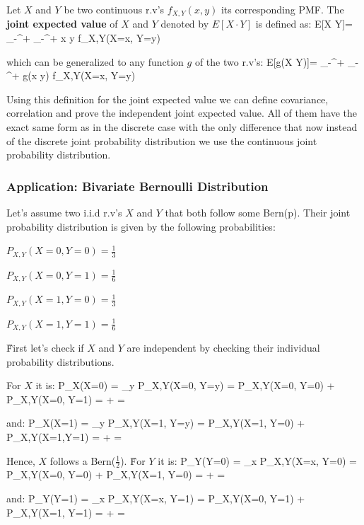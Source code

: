 Let $X$ and $Y$ be two continuous r.v's $f_{X,Y}(x,y)$ its corresponding PMF. The \textbf{joint expected value} of
$X$ and $Y$ denoted by $E[X \cdot Y]$ is defined as:
\bse
E[X \cdot Y]= \int_{-\infty}^{+\infty} \int_{-\infty}^{+\infty} x \cdot y \cdot f_{X,Y}(X=x, Y=y)
\ese
\ed

which can be generalized to any function $g$ of the two r.v's:
\bse
E[g(X \cdot Y)]= \int_{-\infty}^{+\infty} \int_{-\infty}^{+\infty} g(x \cdot y) \cdot f_{X,Y}(X=x, Y=y)
\ese

Using this definition for the joint expected value we can define covariance, correlation and prove the independent
joint expected value. All of them have the exact same form as in the discrete case with the only difference that now
instead of the discrete joint probability distribution we use the continuous joint probability distribution.

\subsubsection*{Application: Bivariate Bernoulli Distribution}

Let's assume two i.i.d r.v's $X$ and $Y$ that both follow some Bern(p). Their joint probability distribution is given
by the following probabilities:
\bit
\item $P_{X,Y}(X=0, Y=0) = \frac{1}{3}$
\item $P_{X,Y}(X=0, Y=1) = \frac{1}{6}$
\item $P_{X,Y}(X=1, Y=0) = \frac{1}{3}$
\item $P_{X,Y}(X=1, Y=1) = \frac{1}{6}$
\eit

\v

First let's check if $X$ and $Y$ are independent by checking their individual probability distributions.

For $X$ it is:
\bse
P_{X}(X=0) = \sum_{y} P_{X,Y}(X=0, Y=y) = P_{X,Y}(X=0, Y=0) + P_{X,Y}(X=0, Y=1) =  +  =
\ese

and:
\bse
P_{X}(X=1) = \sum_{y} P_{X,Y}(X=1, Y=y) = P_{X,Y}(X=1, Y=0) + P_{X,Y}(X=1,Y=1) =  +  = 
\ese

Hence, $X$ follows a Bern\Big($\frac{1}{2}$\Big). \v

For $Y$ it is:
\bse
P_{Y}(Y=0) = \sum_{x} P_{X,Y}(X=x, Y=0) = P_{X,Y}(X=0, Y=0) + P_{X,Y}(X=1, Y=0) =  +  =
\ese

and:
\bse
P_{Y}(Y=1) = \sum_{x} P_{X,Y}(X=x, Y=1) = P_{X,Y}(X=0, Y=1) + P_{X,Y}(X=1, Y=1) =  +  =
\ese

